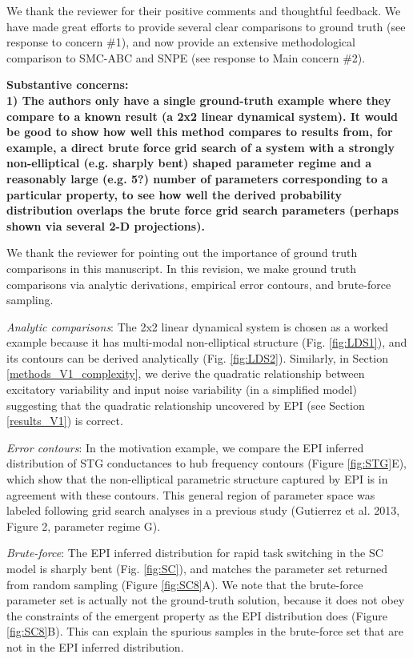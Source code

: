 \documentclass[11pt,a4paper]{article}
\begin{document}
We thank the reviewer for their positive comments and thoughtful feedback.
We have made great efforts to provide several clear comparisons to ground truth (see response to concern \#1), and now provide an extensive methodological comparison to SMC-ABC and SNPE (see response to Main concern \#2).

\textbf{Substantive concerns: \\
1) The authors only have a single ground-truth example where they compare to a known result (a 2x2 linear dynamical system). It would be good to show how well this method compares to results from, for example, a direct brute force grid search of a system with a strongly non-elliptical (e.g. sharply bent) shaped parameter regime and a reasonably large (e.g. 5?) number of parameters corresponding to a particular property, to see how well the derived probability distribution overlaps the brute force grid search parameters (perhaps shown via several 2-D projections). }

We thank the reviewer for pointing out the importance of ground truth comparisons in this manuscript.
In this revision, we make ground truth comparisons via analytic derivations, empirical error contours, and brute-force sampling.

\textit{Analytic comparisons}:
The 2x2 linear dynamical system is chosen as a worked example because it has multi-modal non-elliptical structure (Fig. \ref{fig:LDS1}), and its contours can be derived analytically (Fig. \ref{fig:LDS2}).
Similarly, in Section \ref{methods_V1_complexity}, we derive the quadratic relationship between excitatory variability and input noise variability (in a simplified model) suggesting that the quadratic relationship uncovered by EPI (see Section \ref{results_V1}) is correct.

\textit{Error contours}:
In the motivation example, we compare the EPI inferred distribution of STG conductances to hub frequency contours (Figure \ref{fig:STG}E), which show that the non-elliptical parametric structure captured by EPI is in agreement with these contours.  
This general region of parameter space was labeled following grid search analyses in a previous study (Gutierrez et al. 2013, Figure 2, parameter regime G).

\textit{Brute-force}:
The EPI inferred distribution for rapid task switching in the SC model is sharply bent (Fig. \ref{fig:SC}), and matches the parameter set returned from random sampling (Figure \ref{fig:SC8}A).  
We note that the brute-force parameter set is actually not the ground-truth solution, because it does not obey the constraints of the emergent property as the EPI distribution does (Figure \ref{fig:SC8}B).
This can explain the spurious samples in the brute-force set that are not in the EPI inferred distribution.
\end{document}

